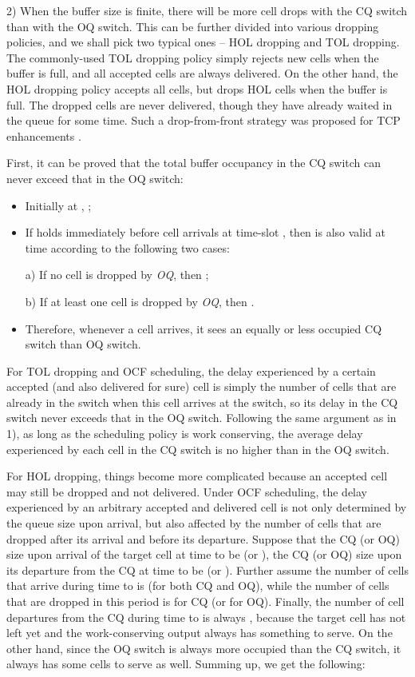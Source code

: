 \documentclass[journal,final,doublecolumn,10pt,twoside]{IEEEtranTCOM} \normalsize
\begin{document}
2) When the buffer size is finite, there will be more cell drops with the CQ switch than with the OQ switch. This can be further divided into various dropping policies, and we shall pick two typical ones -- HOL dropping and TOL dropping. The commonly-used TOL dropping policy simply rejects new cells when the buffer is full, and all accepted cells are always delivered. On the other hand, the HOL dropping policy accepts all cells, but drops HOL cells when the buffer is full. The dropped cells are never delivered, though they have already waited in the queue for some time. Such a drop-from-front strategy was proposed for TCP enhancements \cite{tcphol}.

First, it can be proved that the total buffer occupancy in the CQ switch can never exceed that in the OQ switch:
\begin{itemize}
\item Initially at , ;

\item If  holds immediately before cell arrivals at time-slot , then  is also valid at time  according to the following two cases: 

a) If no cell is dropped by \emph{OQ}, then ; 

b) If at least one cell is dropped by \emph{OQ}, then .
\item Therefore, whenever a cell arrives, it sees an equally or less occupied CQ switch than OQ switch.
\end{itemize}
 
For TOL dropping and OCF scheduling, the delay experienced by a certain accepted (and also delivered for sure) cell is simply the number of cells that are already in the switch when this cell arrives at the switch, so its delay in the CQ switch never exceeds that in the OQ switch. Following the same argument as in 1), as long as the scheduling policy is work conserving, the average delay experienced by each cell in the CQ switch is no higher than in the OQ switch. 

For HOL dropping, things become more complicated because an accepted cell may still be dropped and not delivered. Under OCF scheduling, the delay experienced by an arbitrary accepted and delivered cell is not only determined by the queue size upon arrival, but also affected by the number of cells that are dropped after its arrival and before its departure.  Suppose that the CQ (or OQ) size upon arrival of the target cell at time  to be  (or ), the CQ (or OQ) size upon its departure from the CQ at time  to be  (or ). Further assume the number of cells that arrive during time  to  is  (for both CQ and OQ), while the number of cells that are dropped in this period is  for CQ (or  for OQ). Finally, the number of cell departures from the CQ during time  to  is always , because the target cell has not left yet and the work-conserving output always has something to serve. On the other hand, since the OQ switch is always more occupied than the CQ switch, it always has some cells to serve as well. Summing up, we get the following:
\end{document}
